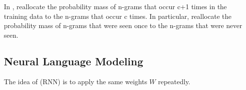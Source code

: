 \documentclass{article}
\begin{document}
In , reallocate the probability mass of n-grams that occur c+1 times in the training data to the n-grams that occur c times. In particular, reallocate the probability mass of n-grams that were seen once to the n-grams that were never seen.  

\subsection{Neural Language Modeling}

The idea of  (RNN) is to apply the same weights $W$ repeatedly. 
\end{document}
